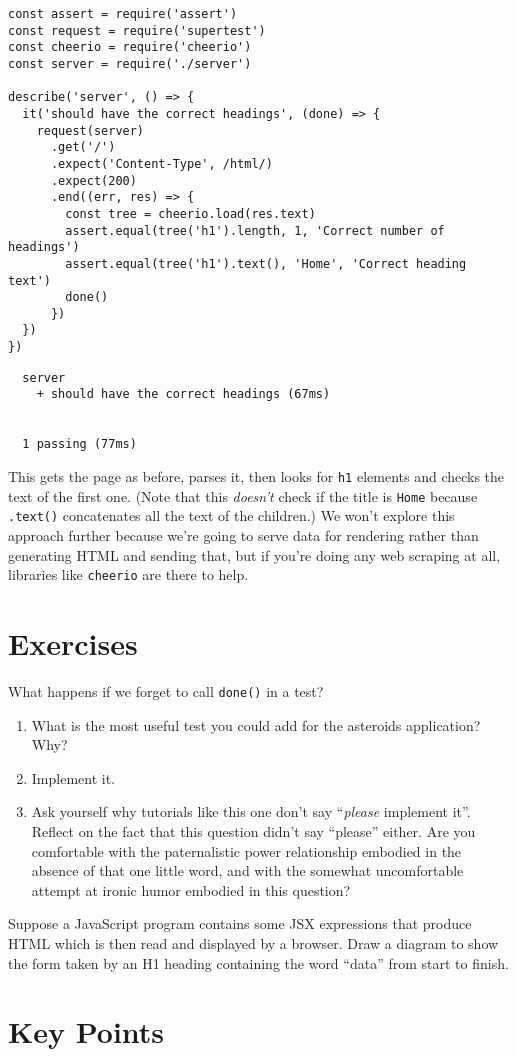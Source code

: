 \begin{verbatim}
const assert = require('assert')
const request = require('supertest')
const cheerio = require('cheerio')
const server = require('./server')

describe('server', () => {
  it('should have the correct headings', (done) => {
    request(server)
      .get('/')
      .expect('Content-Type', /html/)
      .expect(200)
      .end((err, res) => {
        const tree = cheerio.load(res.text)
        assert.equal(tree('h1').length, 1, 'Correct number of headings')
        assert.equal(tree('h1').text(), 'Home', 'Correct heading text')
        done()
      })
  })
})
\end{verbatim}

\begin{verbatim}
  server
    + should have the correct headings (67ms)


  1 passing (77ms)
\end{verbatim}

This gets the page as before,
parses it,
then looks for \texttt{h1} elements and checks the text of the first one.
(Note that this \emph{doesn't} check if the title is \texttt{Home}
because \texttt{.text()} concatenates all the text of the children.)
We won't explore this approach further because we're going to serve data for rendering
rather than generating HTML and sending that,
but if you're doing any web scraping at all,
libraries like \texttt{cheerio} are there to help.

\section{Exercises}\label{s:testing-exercises}


What happens if we forget to call \texttt{done()} in a test?


\begin{enumerate}
\item
  What is the most useful test you could add for the asteroids application?
  Why?
\item
  Implement it.
\item
  Ask yourself why tutorials like this one don't say ``\emph{please} implement it''.
  Reflect on the fact that this question didn't say ``please'' either.
  Are you comfortable with the paternalistic power relationship embodied in the absence of that one little word,
  and with the somewhat uncomfortable attempt at ironic humor embodied in this question?
\end{enumerate}


Suppose a JavaScript program contains some JSX expressions that produce HTML
which is then read and displayed by a browser.
Draw a diagram to show the form taken by an H1 heading containing the word ``data''
from start to finish.

\section*{Key Points}


